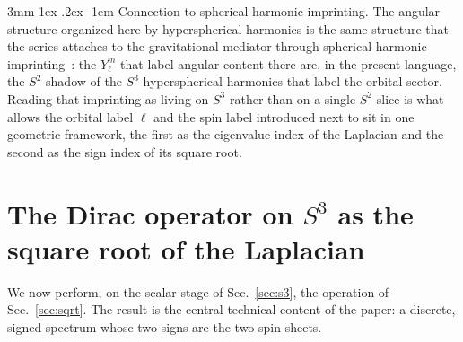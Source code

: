 \documentclass[%
 reprint, amsmath,amssymb, aps, prb, ]{revtex4-2}
\makeatletter
\numberwithin{equation}{section}
\renewcommand\paragraph{%
  \@startsection{paragraph}{4}{\z@}%
    {3mm \@plus 1ex \@minus .2ex}%
    {-1em}%
    {\normalfont\normalsize\itshape}}
\makeatother
\begin{document}
\paragraph{Connection to spherical-harmonic imprinting.}
The angular structure organized here by hyperspherical harmonics is the same structure that the series attaches to the gravitational mediator through spherical-harmonic imprinting~\cite{hanamura57}: the $Y_{\ell}^{m}$ that label angular content there are, in the present language, the $S^{2}$ shadow of the $S^{3}$ hyperspherical harmonics that label the orbital sector. Reading that imprinting as living on $S^{3}$ rather than on a single $S^{2}$ slice is what allows the orbital label $\ell$ and the spin label introduced next to sit in one geometric framework, the first as the eigenvalue index of the Laplacian and the second as the sign index of its square root.

\section{The Dirac operator on $S^{3}$ as the square root of the Laplacian}
\label{sec:dirac}

We now perform, on the scalar stage of Sec.~\ref{sec:s3}, the operation of Sec.~\ref{sec:sqrt}. The result is the central technical content of the paper: a discrete, signed spectrum whose two signs are the two spin sheets.
\end{document}

